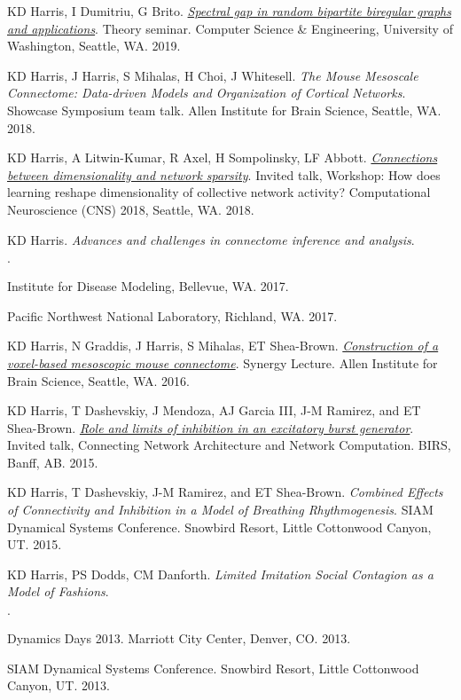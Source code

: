 \documentclass[margin,line]{res}
\newenvironment{list1}{
  \begin{list}{$\cdot$}{%
      \setlength{\itemsep}{0in}
      \setlength{\parsep}{0in} \setlength{\parskip}{0in}
      \setlength{\topsep}{0in} \setlength{\partopsep}{0in} 
      \setlength{\leftmargin}{0.17in}}}{\end{list}}
\begin{document}
\begin{resume}
  KD Harris, I Dumitriu, G Brito.
  \textit{\href{https://glomerul.us/presentations/2019-01-15_random_graph_theory_seminar-expanded.pdf}
    {Spectral gap in random bipartite biregular graphs and applications}}.
  Theory seminar.
  Computer Science \& Engineering, University of Washington,
  Seattle, WA. 2019.

  KD Harris, J Harris, S Mihalas, H Choi, J Whitesell. 
  \textit{The Mouse Mesoscale Connectome: Data-driven Models and Organization of
Cortical Networks}.
  Showcase Symposium team talk.
  Allen Institute for Brain Science, Seattle, WA. 2018.

  KD Harris, A Litwin-Kumar, R Axel, H Sompolinsky, LF Abbott.
  \textit{\href{https://glomerul.us/presentations/2018-07-18_optimal_connectivity.pdf}
    {Connections between dimensionality and network sparsity}}.
  Invited talk, Workshop: 
  How does learning reshape dimensionality of collective network activity?
  Computational Neuroscience (CNS) 2018, Seattle, WA. 2018.

  KD Harris.
  \textit{Advances and challenges in connectome inference and analysis}.
  \begin{list1}
  \item Institute for Disease Modeling, Bellevue, WA. 2017.
  \item Pacific Northwest National Laboratory, Richland, WA. 2017.
  \end{list1}
 
  KD Harris, N Graddis, J Harris, S Mihalas, ET Shea-Brown.
  \textit{\href{https://glomerul.us/presentations/2016-04-01_AIBS_Synergy.pdf}
    {Construction of a voxel-based mesoscopic mouse connectome}}.
  Synergy Lecture. 
  Allen Institute for Brain Science, Seattle, WA. 2016.

  KD Harris, T Dashevskiy, J Mendoza, AJ Garcia III, J-M Ramirez, and ET Shea-Brown.
  \textit{\href{https://glomerul.us/videos/201512101124-Banff-Harris.mp4}
    {Role and limits of inhibition in an excitatory burst generator}}.
  Invited talk, 
  Connecting Network Architecture and Network Computation.
  BIRS, Banff, AB. 2015.

  KD Harris, T Dashevskiy, J-M Ramirez, and ET Shea-Brown.
  \textit{Combined Effects of Connectivity and Inhibition in a Model of 
    Breathing Rhythmogenesis}. 
  SIAM Dynamical Systems Conference. Snowbird Resort, 
  Little Cottonwood Canyon, UT. 2015.

  KD Harris, PS Dodds, CM Danforth.
  \textit{Limited Imitation Social Contagion as a Model of Fashions}.
  \begin{list1}
  \item Dynamics Days 2013. Marriott City Center, Denver, CO. 2013.
  \item SIAM Dynamical Systems Conference. Snowbird Resort,
    Little Cottonwood Canyon, UT. 2013.
  \end{list1}


\end{resume}
\end{document}
